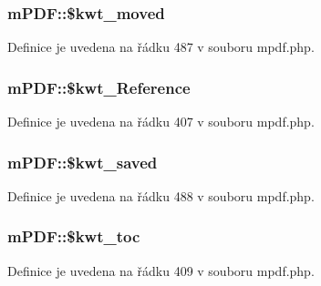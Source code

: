 \hypertarget{classm_p_d_f_a887c57fb82e0b24b07cd0e1332e84b7e}{
\subsubsection[{\$kwt\-\_\-moved}]{\setlength{\rightskip}{0pt plus 5cm}m\-P\-D\-F\-::\$kwt\-\_\-moved}}\label{classm_p_d_f_a887c57fb82e0b24b07cd0e1332e84b7e}


Definice je uvedena na řádku 487 v souboru mpdf.\-php.

\hypertarget{classm_p_d_f_a7760ed025e6f8a1a5e45ccdf0d3da0c8}{
\subsubsection[{\$kwt\-\_\-\-Reference}]{\setlength{\rightskip}{0pt plus 5cm}m\-P\-D\-F\-::\$kwt\-\_\-\-Reference}}\label{classm_p_d_f_a7760ed025e6f8a1a5e45ccdf0d3da0c8}


Definice je uvedena na řádku 407 v souboru mpdf.\-php.

\hypertarget{classm_p_d_f_a67f445305f7454eb871a201d5c57d222}{
\subsubsection[{\$kwt\-\_\-saved}]{\setlength{\rightskip}{0pt plus 5cm}m\-P\-D\-F\-::\$kwt\-\_\-saved}}\label{classm_p_d_f_a67f445305f7454eb871a201d5c57d222}


Definice je uvedena na řádku 488 v souboru mpdf.\-php.

\hypertarget{classm_p_d_f_af879629d74fb9a16be61f6dddb84c102}{
\subsubsection[{\$kwt\-\_\-toc}]{\setlength{\rightskip}{0pt plus 5cm}m\-P\-D\-F\-::\$kwt\-\_\-toc}}\label{classm_p_d_f_af879629d74fb9a16be61f6dddb84c102}


Definice je uvedena na řádku 409 v souboru mpdf.\-php.


